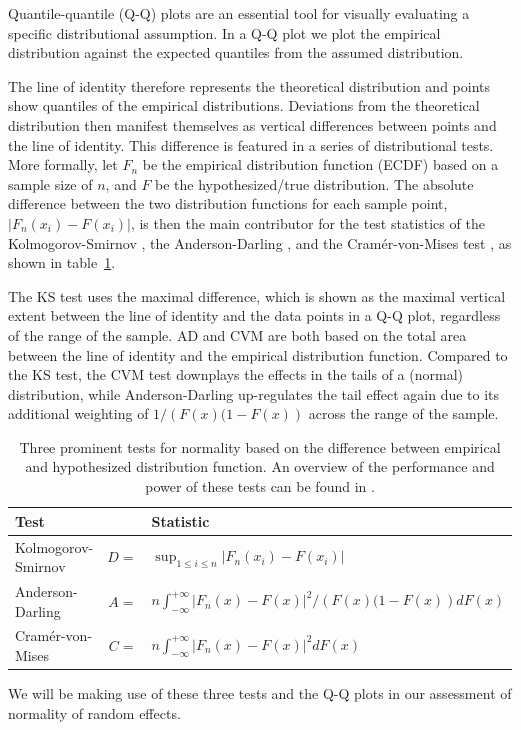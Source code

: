 \documentclass[12pt]{article} %
\newcommand{\hh}[1]{{\color{orange} #1}}
\begin{document}
Quantile-quantile (Q-Q) plots \citep{Wilk:1968} are an essential tool for  visually evaluating a specific distributional assumption. In a Q-Q plot we plot the empirical distribution against the expected quantiles from the assumed distribution. \hh{The line of identity therefore represents the theoretical distribution and points show quantiles of the empirical distributions. Deviations from the theoretical distribution then manifest themselves as vertical differences between points and the line of identity. This difference is featured in a series of distributional tests. More formally, let $F_n$ be the empirical distribution function (ECDF) based on a sample size of $n$, and $F$ be the hypothesized/true distribution. The absolute difference between the two distribution functions for each sample point, $\left| F_n(x_i) - F(x_i) \right|$, is then the main contributor for the test statistics of the Kolmogorov-Smirnov \cite[KS-test,][]{kolmogorov:1933, smirnov:1948}, the Anderson-Darling \citep[AD-test,][]{adtest:1954}, and the Cram\'{e}r-von-Mises test \citep[CVM-test,][]{cramer:1928, mises:1928}, as shown in table~\ref{tab:tests}.

The KS test uses the maximal  difference, which is shown as the maximal vertical extent between the line of identity and the data points in a Q-Q plot, regardless of the range of the sample.  AD and CVM  are both based on the total area between the line of identity and the empirical distribution function. Compared to the KS  test,  the CVM test downplays the effects in the tails of a (normal) distribution, while Anderson-Darling up-regulates the tail effect again due to its additional weighting of $1/\left(F(x)(1 - F(x)\right)$ across the range of the sample. 
\begin{table}
\begin{tabular}{lrl}\hline
Test && Statistic\\\hline\hline
Kolmogorov-Smirnov & $D =$ & $ \sup_{1 \le i \le n} \left | F_n(x_i) - F(x_i)\right|$ \\
Anderson-Darling & $A =$ & $ n \int_{-\infty}^{+\infty} \left | F_n(x) - F(x)\right|^2/\left(F(x)(1 - F(x)\right) dF(x)$\\
Cram\'{e}r-von-Mises & $C =$ & $n \int_{-\infty}^{+\infty} \left | F_n(x) - F(x)\right|^2 dF(x)$ \\\hline
\end{tabular}
\caption{\label{tab:tests} Three prominent tests for normality based on the difference between empirical and hypothesized distribution function. An overview of the performance and power of these tests can be found in \citet{stephens:1974}.}
\end{table}
%
We will be making use of these three tests and the Q-Q plots in our assessment of normality of random effects.
}
\end{document}
